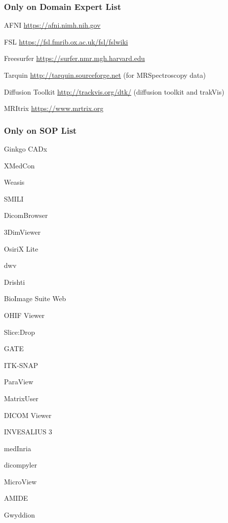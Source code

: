 \documentclass[t,12pt,numbers,fleqn]{beamer}
\begin{document}

\begin{frame}
\frametitle{Only on Domain Expert List}

\bi
\item AFNI \hyperlink{https://afni.nimh.nih.gov}{https://afni.nimh.nih.gov}
\item FSL \hyperlink{https://fsl.fmrib.ox.ac.uk/fsl/fslwiki}{https://fsl.fmrib.ox.ac.uk/fsl/fslwiki} 
\item Freesurfer \hyperlink{https://surfer.nmr.mgh.harvard.edu}{https://surfer.nmr.mgh.harvard.edu} 
\item Tarquin \hyperlink{http://tarquin.sourceforge.net}{http://tarquin.sourceforge.net}  (for MRSpectroscopy data)
\item Diffusion Toolkit  \hyperlink{http://trackvis.org/dtk/}{http://trackvis.org/dtk/} (diffusion toolkit and trakVis)
\item MRItrix \hyperlink{https://www.mrtrix.org}{https://www.mrtrix.org}
\ei

\end{frame}


\begin{frame}
\frametitle{Only on SOP List}

\begin{multicols}{2}	
\bi
\item Ginkgo CADx
\item XMedCon
\item Weasis
\item SMILI
\item DicomBrowser
\item 3DimViewer
\item OsiriX Lite
\item dwv
\item Drishti
\item BioImage Suite Web
\item OHIF Viewer
\item Slice:Drop
\item GATE
\item ITK-SNAP
\item ParaView
\item MatrixUser
\item DICOM Viewer
\item INVESALIUS 3
\item medInria
\item dicompyler
\item MicroView
\item AMIDE
\item Gwyddion
\ei
\end{multicols}

\end{frame}
\end{document}
